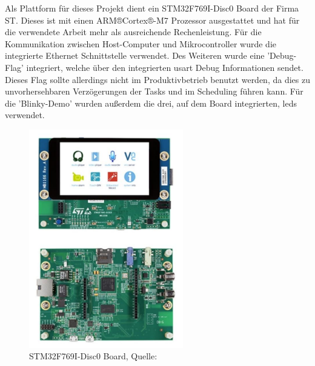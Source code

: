 \documentclass[../EDF Master Thesis.tex]{subfiles}
\begin{document}
Als Plattform für dieses Projekt dient ein STM32F769I-Disc0 Board der Firma ST.
Dieses ist mit einen ARM®Cortex®-M7 Prozessor ausgestattet und hat für die verwendete Arbeit mehr als ausreichende Rechenleistung.
Für die Kommunikation zwischen Host-Computer und Mikrocontroller wurde die integrierte Ethernet Schnittstelle verwendet.
Des Weiteren wurde eine 'Debug-Flag' integriert, welche über den integrierten \ac{usart} Debug Informationen sendet.
Dieses Flag sollte allerdings nicht im Produktivbetrieb benutzt werden, da dies zu unvorhersehbaren Verzögerungen der Tasks und im Scheduling führen kann.
Für die 'Blinky-Demo' wurden außerdem die drei, auf dem Board integrierten, \ac{led}s verwendet.

\begin{figure}[ht!]
    \begin{center}
        \includegraphics[width=0.6\textwidth]{attachments/stm32f769i-disc0.pdf}
    \end{center}
    \caption{STM32F769I-Disc0 Board, Quelle: \autocite{stm:001}}
    \label{fig:STM32F769I-Disc0_board}
\end{figure}
\end{document}
